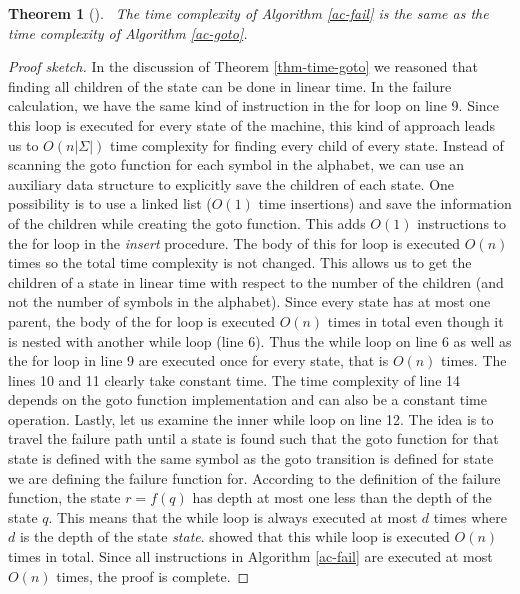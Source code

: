 \documentclass[english,twoside,censored,csm,algorithms-track-2020]{HYthesisML}
\theoremstyle{plain}
\newtheorem{theorem}{Theorem}[chapter]
\theoremstyle{definition}
\begin{document}
\begin{theorem}[]~\label{thm-time-failure}
    The time complexity of Algorithm \ref{ac-fail} is the same as the time complexity of
  Algorithm \ref{ac-goto}.
\end{theorem}
\begin{proof}[Proof sketch]
In the discussion of Theorem
\ref{thm-time-goto} we reasoned that finding all children of the state can be done in
linear time. In the failure calculation, we have the same kind of instruction in the for loop
on line 9. Since this loop is executed for every state of the machine, this kind of approach leads
us to $O(n|\Sigma|)$ time complexity for finding every child of every state. Instead of scanning
the goto function for each symbol in the alphabet, we can use an auxiliary data structure to
explicitly save the children of each state. One possibility is to use a linked list ($O(1)$ time
insertions) and save the information of the children while creating the goto function. This adds
$O(1)$ instructions to the for loop in the \textit{insert} procedure. The body of this for loop
is executed $O(n)$ times so the total time complexity is not changed. This allows us to get the
children of a state in linear time with respect to the number of the children (and not the number of
symbols in the alphabet). Since every state
has at most one parent, the body of the for loop is executed $O(n)$ times in total even though it
is nested with another while loop (line 6). Thus the while loop on line 6 as well as the for loop in
line 9 are executed once for every state, that is $O(n)$ times. The lines 10 and 11 clearly take constant
time. The time complexity of line 14 depends on the goto function implementation and
can also be a constant time operation. Lastly, let us examine the inner while loop on line 12.
The idea is to travel the failure path until a state is found such that the goto function
for that state is defined with the same symbol as the goto transition is defined for state we are
defining the failure function for. According to the definition of the failure function, the state
$r=f(q)$ has depth at most one less than the depth of the state $q$. This means that the while
loop is always executed at most $d$ times where $d$ is the depth of the state \textit{state}.
\citep{Aho75} showed that this while loop is executed $O(n)$ times in total. Since all instructions
in Algorithm \ref{ac-fail} are executed at most $O(n)$ times, the proof is complete.

\end{proof}
\end{document}
